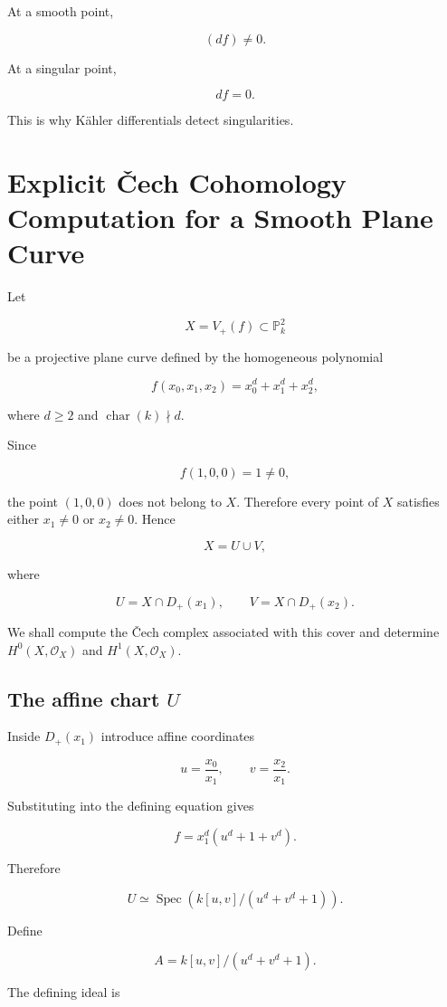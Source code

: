\documentclass[12pt,a4paper]{article}
\theoremstyle{notespace}
\begin{document}
At a smooth point,

\[
(df)\neq0.
\]

At a singular point,

\[
df=0.
\]

This is why K\"ahler differentials detect singularities.



\section{Explicit Čech Cohomology Computation for a Smooth Plane Curve}

Let

\[
X = V_+(f) \subset \mathbb{P}^2_k
\]

be a projective plane curve defined by the homogeneous polynomial

\[
f(x_0,x_1,x_2)=x_0^d+x_1^d+x_2^d,
\]

where \(d\geq 2\) and \(\operatorname{char}(k)\nmid d\).

Since

\[
f(1,0,0)=1\neq 0,
\]

the point \((1,0,0)\) does not belong to \(X\). Therefore every point of \(X\) satisfies either \(x_1\neq 0\) or \(x_2\neq 0\). Hence

\[
X = U \cup V,
\]

where

\[
U=X\cap D_+(x_1),
\qquad
V=X\cap D_+(x_2).
\]

We shall compute the Čech complex associated with this cover and determine
\(H^0(X,\mathcal O_X)\) and \(H^1(X,\mathcal O_X)\).

\subsection{The affine chart \(U\)}

Inside \(D_+(x_1)\) introduce affine coordinates

\[
u=\frac{x_0}{x_1},
\qquad
v=\frac{x_2}{x_1}.
\]

Substituting into the defining equation gives

\[
f=x_1^d(u^d+1+v^d).
\]

Therefore

\[
U
\simeq
\operatorname{Spec}
\left(
k[u,v]/(u^d+v^d+1)
\right).
\]

Define

\[
A=
k[u,v]/(u^d+v^d+1).
\]

The defining ideal is
\end{document}
